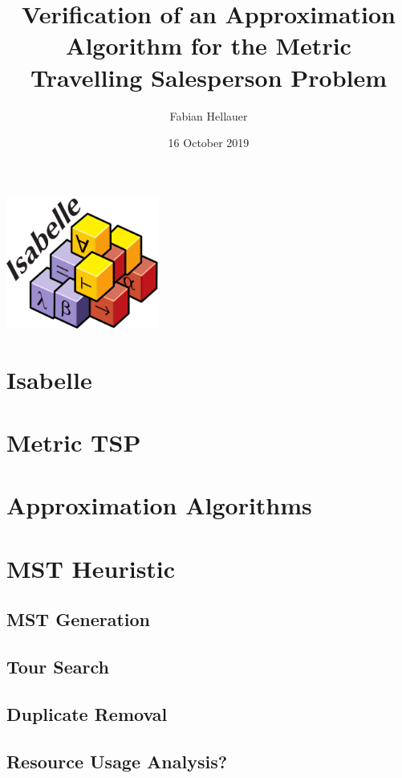 \documentclass[%
	sans,
	12pt,
]{beamer}
\title{Verification of an Approximation Algorithm for the Metric Travelling Salesperson Problem}
\author{\normalsize Fabian Hellauer}
\institute[]{\footnotesize Technische Universität München}
\date{\footnotesize16 October 2019}
\begin{document}
\maketitle

\begin{frame}
\begin{center}
\includegraphics[width=5cm]{isabelle.pdf}
\end{center}
\end{frame}

\tableofcontents	%

\newcommand{\pivot}[1]{{\color{red}#1}}
\newcommand{\ltpiv}[1]{{\color{blue}#1}}
\newcommand{\gtpiv}[1]{{\color{olive}#1}}

\section{Isabelle}
\section{Metric TSP}
\section{Approximation Algorithms}
\section{MST Heuristic} %
    \subsection{MST Generation}
    \subsection{Tour Search}
    \subsection{Duplicate Removal}
    \subsection{Resource Usage Analysis?}%
\end{document}
